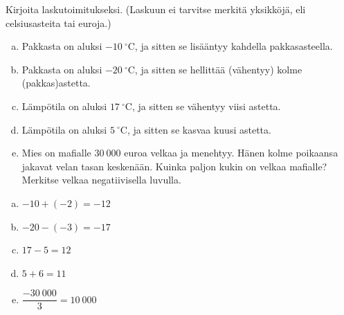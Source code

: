     
        \begin{tehtava}
        Kirjoita laskutoimitukseksi. (Laskuun ei tarvitse merkitä yksikköjä, eli celsiusasteita tai euroja.)


        \begin{enumerate}[a)]
            \item Pakkasta on aluksi $-10~^{\circ}$C, ja sitten se lisääntyy kahdella pakkasasteella.
            \item Pakkasta on aluksi $-20~^{\circ}$C, ja sitten se hellittää (vähentyy) kolme (pakkas)astetta.
            \item Lämpötila on aluksi $17~^{\circ}$C, ja sitten se vähentyy viisi astetta.
            \item Lämpötila on aluksi $5~^{\circ}$C, ja sitten se kasvaa kuusi astetta.
            \item Mies on mafialle $30~000$ euroa velkaa ja menehtyy. Hänen kolme 
                poikaansa jakavat velan tasan keskenään. Kuinka paljon kukin on
                velkaa mafialle? Merkitse velkaa negatiivisella luvulla.
        \end{enumerate}
        
        \begin{vastaus}
            \begin{enumerate}[a)]
                \item $-10+(-2)=-12$
                \item $-20-(-3)=-17$
                \item $17-5=12$
                \item $5+6=11$
                \item $\dfrac{-30~000}{3}=10~000$
            \end{enumerate}
        \end{vastaus}
    \end{tehtava}
    
